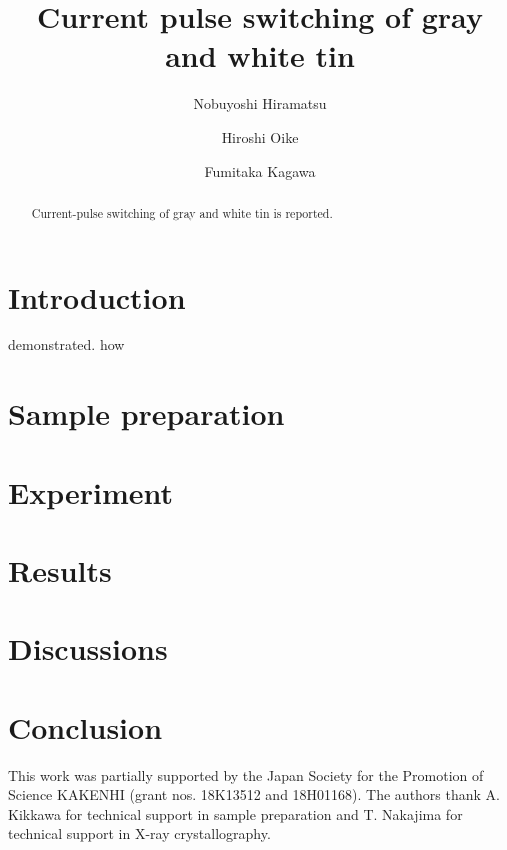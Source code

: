 \documentclass[aip,apl,reprint]{revtex4-1}
\begin{document}
\title{Current pulse switching of gray and white tin} 
\author{Nobuyoshi Hiramatsu}
\author{Hiroshi Oike}
\author{Fumitaka Kagawa}

\begin{abstract}
Current-pulse switching of gray and white tin is reported.
\end{abstract}

\maketitle 
\section{Introduction}
demonstrated. how

\section{Sample preparation}

\section{Experiment}

\section{Results}


\section{Discussions}

\section{Conclusion}

\begin{acknowledgments}
This work was partially supported by the Japan Society for the Promotion of Science KAKENHI (grant nos. 18K13512 and 18H01168).
The authors thank A. Kikkawa for technical support in sample preparation and T. Nakajima for technical support in X-ray crystallography.
\end{acknowledgments}


\end{document}
